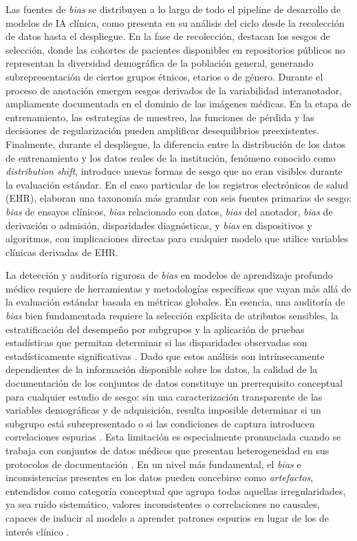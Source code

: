 Las fuentes de \textit{bias} se distribuyen a lo largo de todo el pipeline de desarrollo de modelos de IA clínica, como presenta \citeauthor{sahiner2023} en su análisis del 
ciclo desde la recolección de datos hasta el despliegue. En la fase de recolección, destacan los sesgos de selección, donde las cohortes de pacientes disponibles en repositorios 
públicos no representan la diversidad demográfica de la población general, generando subrepresentación de ciertos grupos étnicos, etarios o de género. Durante el proceso de anotación 
emergen sesgos derivados de la variabilidad interanotador, ampliamente documentada en el dominio de las imágenes médicas. En la etapa de entrenamiento, las estrategias de muestreo, 
las funciones de pérdida y las decisiones de regularización pueden amplificar desequilibrios preexistentes. Finalmente, durante el despliegue, la diferencia entre la distribución de 
los datos de entrenamiento y los datos reales de la institución, fenómeno conocido como \textit{distribution shift}, introduce nuevas formas de sesgo que no eran visibles durante la 
evaluación estándar. En el caso particular de los registros electrónicos de salud (EHR), \citeauthor{perets2024} elaboran una taxonomía más granular con seis fuentes
primarias de sesgo: \textit{bias} de ensayos clínicos, \textit{bias} relacionado con datos, \textit{bias} del anotador, \textit{bias} de derivación o admisión, disparidades diagnósticas, 
y \textit{bias} en dispositivos y algoritmos, con implicaciones directas para cualquier modelo que utilice variables clínicas derivadas de EHR.

La detección y auditoría rigurosa de \textit{bias} en modelos de aprendizaje profundo médico requiere de  herramientas y metodologías
específicas que vayan más allá de la evaluación estándar basada en métricas globales. 
En esencia, una auditoría de \textit{bias} bien fundamentada requiere la selección explícita de atributos sensibles, la estratificación del desempeño por subgrupos y la aplicación
de pruebas estadísticas que permitan determinar si las disparidades observadas son estadísticamente significativas \citep{stanley2024}. Dado que estos análisis son intrínsecamente dependientes 
de la información disponible sobre los datos, la calidad de la documentación de los conjuntos de datos constituye un prerrequisito conceptual para cualquier estudio de sesgo: sin una 
caracterización transparente de las variables demográficas y de adquisición, resulta imposible determinar si un subgrupo está subrepresentado o si las condiciones de captura introducen 
correlaciones espurias \citep{galanty2024}. Esta limitación es especialmente pronunciada cuando se trabaja con conjuntos de datos médicos que presentan heterogeneidad en sus protocolos de
documentación \citep{drenkow2025}. En un nivel más fundamental, el \textit{bias} e inconsistencias presentes en los datos pueden concebirse como \textit{artefactos}, entendidos como categoría
conceptual que agrupa todas aquellas irregularidades, ya sea ruido sistemático, valores inconsistentes o correlaciones no causales, capaces de inducir al modelo a aprender patrones espurios en 
lugar de los de interés clínico \citep{teixeira2025}. 

